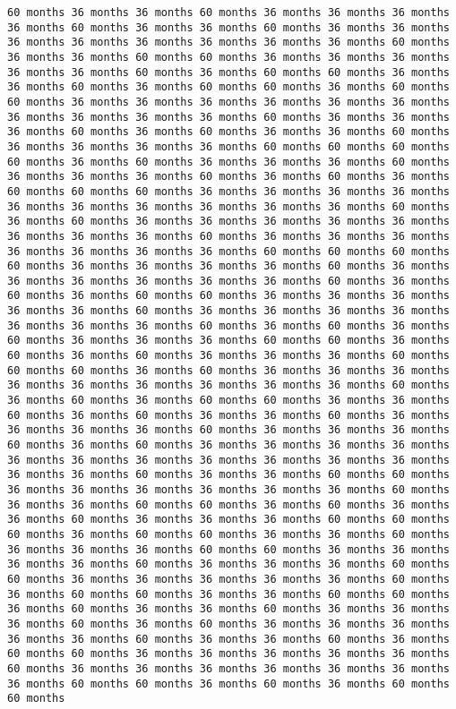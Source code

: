 \documentclass[11pt]{article}
\begin{document}
\begin{Verbatim}[commandchars=\\\{\}, frame=single, framerule=2mm, rulecolor=\color{outerrorbackground}]
60 months 36 months 36 months 60 months 36 months 36 months 36 months 36 months 60 months 36 months 36 months 60 months 36 months 36 months 36 months 36 months 36 months 36 months 36 months 36 months 60 months 36 months 36 months 60 months 60 months 36 months 36 months 36 months 36 months 36 months 60 months 36 months 60 months 60 months 36 months 36 months 60 months 36 months 60 months 60 months 36 months 60 months 60 months 36 months 36 months 36 months 36 months 36 months 36 months 36 months 36 months 36 months 36 months 60 months 36 months 36 months 36 months 60 months 36 months 60 months 36 months 36 months 60 months 36 months 36 months 36 months 36 months 60 months 60 months 60 months 60 months 36 months 60 months 36 months 36 months 36 months 60 months 36 months 36 months 36 months 60 months 36 months 60 months 36 months 60 months 60 months 60 months 36 months 36 months 36 months 36 months 36 months 36 months 36 months 36 months 36 months 36 months 60 months 36 months 60 months 36 months 36 months 36 months 36 months 36 months 36 months 36 months 36 months 60 months 36 months 36 months 36 months 36 months 36 months 36 months 36 months 60 months 60 months 60 months 60 months 36 months 36 months 36 months 36 months 60 months 36 months 36 months 36 months 36 months 36 months 36 months 60 months 36 months 60 months 36 months 60 months 60 months 36 months 36 months 36 months 36 months 36 months 60 months 36 months 36 months 36 months 36 months 36 months 36 months 36 months 60 months 36 months 60 months 36 months 60 months 36 months 36 months 36 months 60 months 60 months 36 months 60 months 36 months 60 months 36 months 36 months 36 months 60 months 60 months 60 months 36 months 60 months 36 months 36 months 36 months 36 months 36 months 36 months 36 months 36 months 36 months 60 months 36 months 60 months 36 months 60 months 60 months 36 months 36 months 60 months 36 months 60 months 36 months 36 months 60 months 36 months 36 months 36 months 36 months 60 months 36 months 36 months 36 months 60 months 36 months 60 months 36 months 36 months 36 months 36 months 36 months 36 months 36 months 36 months 36 months 36 months 36 months 36 months 36 months 60 months 36 months 36 months 60 months 60 months 36 months 36 months 36 months 36 months 36 months 36 months 60 months 36 months 36 months 60 months 60 months 36 months 60 months 36 months 36 months 60 months 36 months 36 months 36 months 60 months 60 months 60 months 36 months 60 months 60 months 36 months 36 months 60 months 36 months 36 months 36 months 60 months 60 months 36 months 36 months 36 months 36 months 60 months 36 months 36 months 36 months 60 months 60 months 36 months 36 months 36 months 36 months 36 months 60 months 36 months 60 months 60 months 36 months 36 months 60 months 60 months 36 months 60 months 36 months 36 months 60 months 36 months 36 months 36 months 60 months 36 months 60 months 36 months 36 months 36 months 36 months 36 months 60 months 36 months 36 months 60 months 36 months 60 months 60 months 36 months 36 months 36 months 36 months 36 months 60 months 36 months 36 months 36 months 36 months 36 months 36 months 36 months 60 months 60 months 36 months 60 months 36 months 60 months 60 months 
\end{Verbatim}
\end{document}
